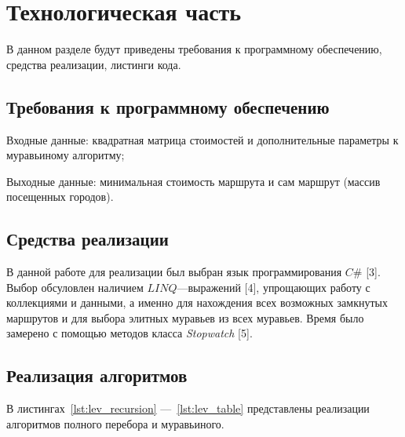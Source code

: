 \chapter{Технологическая часть}

В данном разделе будут приведены требования к программному обеспечению, средства реализации, листинги кода.

\section{Требования к программному обеспечению}

Входные данные: квадратная матрица стоимостей и дополнительные параметры к муравьиному алгоритму;

Выходные данные: минимальная стоимость маршрута и сам маршрут (массив посещенных городов).

\section{Средства реализации}
В данной работе для реализации был выбран язык программирования $C\#$ [3]. Выбор обсуловлен наличием $LINQ$---выражений [4], упрощающих работу с коллекциями и данными, а именно для нахождения всех возможных замкнутых маршрутов и для выбора элитных муравьев из всех муравьев. Время было замерено с помощью методов класса \textit{Stopwatch} [5].

\section{Реализация алгоритмов}

В листингах~\ref{lst:lev_recursion} ---~\ref{lst:lev_table} представлены реализации алгоритмов полного перебора и муравьиного.

\clearpage

